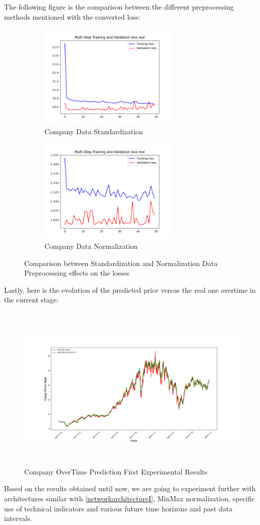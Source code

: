 The following figure is the comparison between the different preprocessing methods mentioned with the converted loss:

\begin{figure}[H]
\begin{subfigure}{0.47\textwidth}
\includegraphics[width=0.9\linewidth, height=5cm]{images/CompanyLossStandardization.png} 
\caption{Company Data Standardization}
\label{fig:companydatastandardization}
\end{subfigure}
\begin{subfigure}{0.47\textwidth}
\includegraphics[width=0.9\linewidth,height=5cm]{images/CompanyLossNormalization.png}
\caption{Company Data Normalization}
\label{fig:companydatanormalization}
\end{subfigure}
\caption{Comparison between Standardization and Normalization Data Preprocessing effects on the losses}
\label{fig:standardizationnormalizationpreprocessing}
\end{figure}

Lastly, here is the evolution of the predicted price versus the real one overtime in the current stage:

\begin{figure}[H]
\centering
\includegraphics[height=8cm]{images/InitialCompanyGraphPrediction.png} 
\caption{Company OverTime Prediction First Experimental Results}
\label{fig:companyovertimeprediction}
\end{figure}

Based on the results obtained until now, we are going to experiment further with architectures similar with \ref{networkarchitectureI}, MinMax normalization, specific use of technical indicators and various future time horizons and past data intervals.


